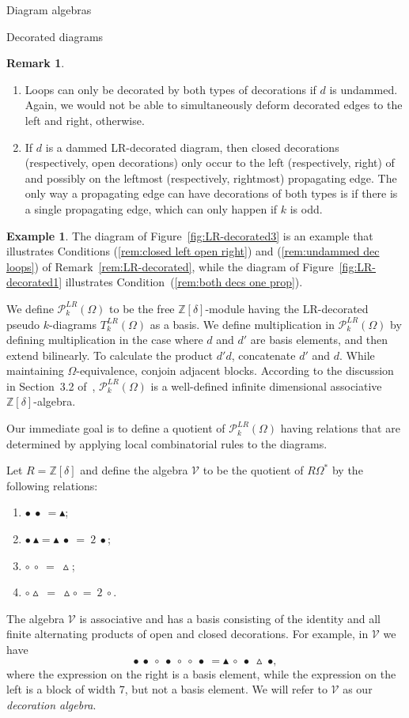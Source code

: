 \documentclass[11pt]{amsart}
\theoremstyle{definition}
\newtheorem{example}[theorem]{Example}
\newtheorem{remark}[theorem]{Remark}
\numberwithin{equation}{section}
\newcommand{\Z}{\mathbb{Z}}
\newcommand{\wtri}{\vartriangle}
\newcommand{\btri}{\blacktriangle}
\renewcommand{\P}{\mathcal{P}}
\newcommand{\V}{\mathcal{V}}
\newcommand{\wcirc}{\circ}
\newcommand{\bcirc}{\bullet}
\renewcommand{\(}{\left(}
\renewcommand{\)}{\right)}
\begin{document}
\begin{section}{Diagram algebras}
\begin{subsection}{Decorated diagrams}
\begin{remark}
\begin{enumerate}
\item \label{rem:undammed dec loops} Loops can only be decorated by both types of decorations if $d$ is undammed.  Again, we would not be able to simultaneously deform decorated edges to the left and right, otherwise.

\item \label{rem:both decs one prop} If $d$ is a dammed LR-decorated diagram, then closed decorations (respectively, open decorations) only occur to the left (respectively, right) of and possibly on the leftmost (respectively, rightmost) propagating edge.  The only way a propagating edge can have decorations of both types is if there is a single propagating edge, which can only happen if $k$ is odd.
\end{enumerate}
\end{remark}

\begin{example}
The diagram of Figure~\ref{fig:LR-decorated3} is an example that illustrates Conditions (\ref{rem:closed left open right}) and (\ref{rem:undammed dec loops}) of Remark~\ref{rem:LR-decorated}, while the diagram of Figure~\ref{fig:LR-decorated1} illustrates Condition~(\ref{rem:both decs one prop}).
\end{example}

We define $\P_{k}^{LR}(\Omega)$ to be the free $\Z[\delta]$-module having the LR-decorated pseudo $k$-diagrams $T_{k}^{LR}(\Omega)$ as a basis.  We define multiplication in $\P_{k}^{LR}(\Omega)$ by defining multiplication in the case where $d$ and $d'$ are basis elements, and then extend bilinearly.  To calculate the product $d'd$, concatenate $d'$ and $d$.  While maintaining $\Omega$-equivalence, conjoin adjacent blocks.  According to the discussion in Section~3.2 of~\cite{Ernst2012}, $\P_{k}^{LR}(\Omega)$ is a well-defined infinite dimensional associative $\Z[\delta]$-algebra.

Our immediate goal is to define a quotient of $\P_{k}^{LR}(\Omega)$ having relations that are determined by applying local combinatorial rules to the diagrams. 

Let $R=\Z[\delta]$ and define the algebra $\V$ to be the quotient of $R\Omega^{*}$ by the following relations:
\begin{enumerate}
\item $\bcirc~\bcirc~=\btri$;
\item $\bcirc~\btri=\btri~\bcirc~=~2~\bcirc$;
\item $\wcirc~\wcirc~=~\wtri$;
\item $\wcirc\wtri~=~\wtri\wcirc~=~2~\wcirc$.
\end{enumerate}
The algebra $\V$ is associative and has a basis consisting of the identity and all finite alternating products of open and closed decorations.  For example, in $\V$ we have
\[
\bcirc~\bcirc~\wcirc~\bcirc~\wcirc~\wcirc~\bcirc~=\btri~\wcirc~\bcirc~\wtri~\bcirc,
\]
where the expression on the right is a basis element, while the expression on the left is a block of width 7, but not a basis element.  We will refer to $\V$ as our \emph{decoration algebra}.


\end{subsection}
\end{section}
\end{document}
